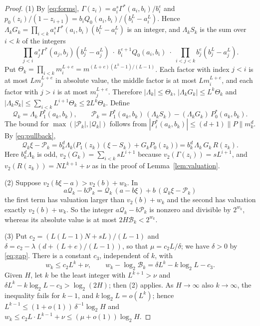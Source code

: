 \documentclass[11pt,reqno]{amsart}
\theoremstyle{definition}
\theoremstyle{remark}
\newcommand{\vt}{v_2}
\begin{document}
\begin{proof}
(1) By \eqref{eq:forms},
$\Gamma(z_i)=a_i^{s}\Gamma^{*}(a_i,b_i)/b_i^{e}$ and
$p_0(z_i)/(1-z_{i+1})=b_iQ_0(a_i,b_i)/(b_i^{L}-a_i^{L})$.  Hence
$\Lambda_kG_k=\prod_{i<k}a_i^{s}\Gamma^{*}(a_i,b_i)(b_i^{L}-a_i^{L})$ is an
integer, and $\Lambda_kS_k$ is the sum over $i<k$ of the integers
\[
  \prod_{j<i}a_j^{s}\Gamma^{*}(a_j,b_j)(b_j^{L}-a_j^{L})\;\cdot\;
  b_i^{e+1}Q_0(a_i,b_i)\;\cdot\;\prod_{i<j<k}b_j^{e}(b_j^{L}-a_j^{L}).
\]
Put $\Theta_k=\prod_{i<k}m_i^{L+e}=m^{(L+e)(L^{k}-1)/(L-1)}$.  Each factor
with index $j<i$ is at most $Lm_j^{L+e}$ in absolute value, the middle
factor is at most $Lm_i^{L+e}$, and each factor with $j>i$ is at most
$m_j^{L+e}$.  Therefore $|\Lambda_k|\le\Theta_k$,
$|\Lambda_kG_k|\le L^{k}\Theta_k$ and
$|\Lambda_kS_k|\le\sum_{i<k}L^{i+1}\Theta_k\le 2L^{k}\Theta_k$.  Define
\[
  \mathcal Q_k=\Lambda_k\,P_1^{*}(a_k,b_k),\qquad
  \mathcal P_k=P_1^{*}(a_k,b_k)\,(\Lambda_kS_k)-(\Lambda_kG_k)\,P_0^{*}(a_k,b_k).
\]
The bound for $\max(|\mathcal P_k|,|\mathcal Q_k|)$ follows from
$|P_i^{*}(a_k,b_k)|\le(d+1)\|P\|m_k^{d}$.  By \eqref{eq:pullback},
\[
  \mathcal Q_k\xi-\mathcal P_k
  =b_k^{d}\Lambda_k\bigl(P_1(z_k)(\xi-S_k)+G_kP_0(z_k)\bigr)
  =b_k^{d}\,\Lambda_k\,G_k\,R(z_k).
\]
Here $b_k^{d}\Lambda_k$ is odd, $\vt(G_k)=\sum_{i<k}sL^{i+1}$ because
$\vt(\Gamma(z_i))=sL^{i+1}$, and $\vt(R(z_k))=NL^{k+1}+\nu$ as in the proof
of Lemma~\ref{lem:valuation}.

(2) Suppose $\vt(b\xi-a)>\vt(b)+w_k$.  In
\[
  a\mathcal Q_k-b\mathcal P_k=\mathcal Q_k\,(a-b\xi)+b\,(\mathcal Q_k\xi-\mathcal P_k)
\]
the first term has valuation larger than $\vt(b)+w_k$ and the second has
valuation exactly $\vt(b)+w_k$.  So the integer $a\mathcal Q_k-b\mathcal P_k$
is nonzero and divisible by $2^{w_k}$, whereas its absolute value is at most
$2H\mathcal B_k<2^{w_k}$.

(3) Put $c_2=(L(L-1)N+sL)/(L-1)$ and
$\delta=c_2-\lambda\,(d+(L+e)/(L-1))$, so that $\mu=c_2L/\delta$; we have
$\delta>0$ by \eqref{eq:gap}.  There is a constant $c_3$, independent of
$k$, with
\[
  w_k\le c_2L^{k}+\nu,\qquad
  w_k-\log_2\mathcal B_k=\delta L^{k}-k\log_2L-c_3 .
\]
Given $H$, let $k$ be the least integer with $L^{k+1}>\nu$ and
$\delta L^{k}-k\log_2L-c_3>\log_2(2H)$; then \textup{(2)} applies.  As
$H\to\infty$ also $k\to\infty$, the inequality fails for $k-1$, and
$k\log_2L=o(L^{k})$; hence $L^{k-1}\le(1+o(1))\,\delta^{-1}\log_2H$ and
$w_k\le c_2L\cdot L^{k-1}+\nu\le(\mu+o(1))\log_2H$.
\end{proof}
\end{document}
